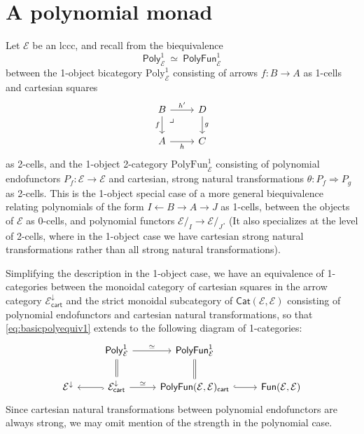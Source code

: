 \documentclass[12pt,reqno]{amsart}
\newcommand{\ednote}[1]{[\textit{\color{red}{#1}}]} %
\newcommand{\DD}{\ensuremath{\mathcal{D}}}
\newcommand{\EE}{\ensuremath{\mathcal{E}}}
\newcommand{\Cat}{\ensuremath{\mathsf{Cat}}}
\newcommand{\alg}[1]{\ensuremath{\mathsf{#1}}}
\renewcommand{\to}{\ensuremath{\rightarrow}}
\renewcommand{\t}{\ensuremath{\mathsf{u}}}
\newcommand{\pbcorner}{\arrow[dr,phantom,"\lrcorner" very near start, shift right=.5ex]} %
\theoremstyle{remark}
\theoremstyle{definition}
\begin{document}
\section{A polynomial monad}\label{sec:Monad}
%
%
%

Let $\EE$ be an lccc, and recall from \cite[Theorem 2.17]{GambinoKoch:2013} the biequivalence 
\begin{equation}\label{eq:basicpolyequiv1}
\mathsf{Poly}^1_{\EE}\ \simeq\ \mathsf{PolyFun}^1_{\EE}
\end{equation}
between the 1-object bicategory $\mathrm{Poly}^1_{\EE}$ consisting of arrows $f:B \to A$ as 1-cells and cartesian squares
\begin{equation}\label{diag:cartsquare}
\begin{tikzcd}
B \ar[d,swap, "f"] \ar[r, "{h'}"] \pbcorner & D \ar[d, "g"] \\
A \ar[r,swap, "{h}"] &  C 
\end{tikzcd}
\end{equation}
as 2-cells, and the 1-object 2-category $\mathrm{PolyFun}^1_{\EE}$ consisting of polynomial endofunctors $P_f: \EE\to \EE$ and cartesian, strong natural transformations $\theta : P_f \Rightarrow P_g$ as 2-cells.  This is the 1-object special case of a more general biequivalence relating polynomials of the form $I \leftarrow B \to A \to J$ as 1-cells, between the objects of $\EE$ as 0-cells, and polynomial functors $\EE/_I \to \EE/_J$. (It also specializes at the level of 2-cells, where in the 1-object case we have cartesian strong natural transformations rather than all strong natural transformations).  

Simplifying the description in the 1-object case, we have an equivalence of 1-categories between the monoidal category of cartesian squares in the arrow category $\EE^{\downarrow}_{\mathsf{cart}}$ and the strict monoidal subcategory of $\Cat(\EE, \EE)$ consisting of polynomial endofunctors and cartesian natural transformations, so that \eqref{eq:basicpolyequiv1} extends to the following diagram of 1-categories:
\begin{equation}\label{diagram:polyandpolyfun}
\begin{tikzcd}
& \mathsf{Poly}^1_{\EE} \ar[d,equals] \ar[r,"{\simeq}"] & \mathsf{PolyFun}^1_{\EE}  \ar[d,equals] &\\
\EE^{\downarrow}  &\EE^{\downarrow}_{\mathsf{cart}} \ar[l, hook] \ar[r,"{\simeq}"] & \mathsf{PolyFun}(\EE, \EE)_{\mathsf{cart}}  \ar[r, hook] & \mathsf{Fun}(\EE, \EE)
\end{tikzcd}
\end{equation}
Since cartesian natural transformations between polynomial endofunctors are always strong, we may omit mention of the strength in the polynomial case.
\end{document}
